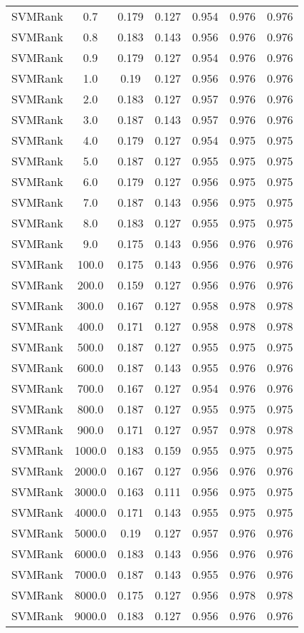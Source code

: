 \begin{longtable}{*{7}{c}}
SVMRank & 0.7 & 0.179 & 0.127 & 0.954 & 0.976 & 0.976 \\ 
SVMRank & 0.8 & 0.183 & 0.143 & 0.956 & 0.976 & 0.976 \\ 
SVMRank & 0.9 & 0.179 & 0.127 & 0.954 & 0.976 & 0.976 \\ 
SVMRank & 1.0 & 0.19 & 0.127 & 0.956 & 0.976 & 0.976 \\ 
SVMRank & 2.0 & 0.183 & 0.127 & 0.957 & 0.976 & 0.976 \\ 
SVMRank & 3.0 & 0.187 & 0.143 & 0.957 & 0.976 & 0.976 \\ 
SVMRank & 4.0 & 0.179 & 0.127 & 0.954 & 0.975 & 0.975 \\ 
SVMRank & 5.0 & 0.187 & 0.127 & 0.955 & 0.975 & 0.975 \\ 
SVMRank & 6.0 & 0.179 & 0.127 & 0.956 & 0.975 & 0.975 \\ 
SVMRank & 7.0 & 0.187 & 0.143 & 0.956 & 0.975 & 0.975 \\ 
SVMRank & 8.0 & 0.183 & 0.127 & 0.955 & 0.975 & 0.975 \\ 
SVMRank & 9.0 & 0.175 & 0.143 & 0.956 & 0.976 & 0.976 \\ 
SVMRank & 100.0 & 0.175 & 0.143 & 0.956 & 0.976 & 0.976 \\ 
SVMRank & 200.0 & 0.159 & 0.127 & 0.956 & 0.976 & 0.976 \\ 
SVMRank & 300.0 & 0.167 & 0.127 & 0.958 & 0.978 & 0.978 \\ 
SVMRank & 400.0 & 0.171 & 0.127 & 0.958 & 0.978 & 0.978 \\ 
SVMRank & 500.0 & 0.187 & 0.127 & 0.955 & 0.975 & 0.975 \\ 
SVMRank & 600.0 & 0.187 & 0.143 & 0.955 & 0.976 & 0.976 \\ 
SVMRank & 700.0 & 0.167 & 0.127 & 0.954 & 0.976 & 0.976 \\ 
SVMRank & 800.0 & 0.187 & 0.127 & 0.955 & 0.975 & 0.975 \\ 
SVMRank & 900.0 & 0.171 & 0.127 & 0.957 & 0.978 & 0.978 \\ 
SVMRank & 1000.0 & 0.183 & 0.159 & 0.955 & 0.975 & 0.975 \\ 
SVMRank & 2000.0 & 0.167 & 0.127 & 0.956 & 0.976 & 0.976 \\ 
SVMRank & 3000.0 & 0.163 & 0.111 & 0.956 & 0.975 & 0.975 \\ 
SVMRank & 4000.0 & 0.171 & 0.143 & 0.955 & 0.975 & 0.975 \\ 
SVMRank & 5000.0 & 0.19 & 0.127 & 0.957 & 0.976 & 0.976 \\ 
SVMRank & 6000.0 & 0.183 & 0.143 & 0.956 & 0.976 & 0.976 \\ 
SVMRank & 7000.0 & 0.187 & 0.143 & 0.955 & 0.976 & 0.976 \\ 
SVMRank & 8000.0 & 0.175 & 0.127 & 0.956 & 0.978 & 0.978 \\ 
SVMRank & 9000.0 & 0.183 & 0.127 & 0.956 & 0.976 & 0.976 \\ 
\end{longtable}